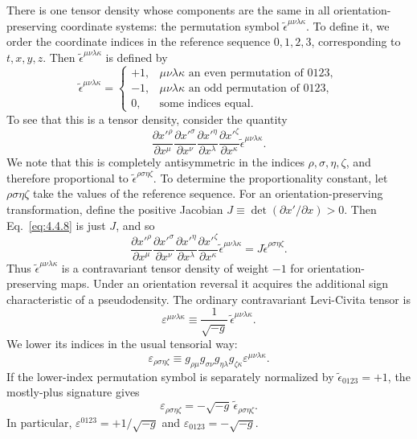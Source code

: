 There is one tensor density whose components are the same in all
orientation-preserving coordinate systems: the permutation symbol
\(\tilde\epsilon^{\mu\nu\lambda\kappa}\). To define it, we order the
coordinate indices in the reference sequence \(0,1,2,3\), corresponding to
\(t,x,y,z\). Then \(\tilde\epsilon^{\mu\nu\lambda\kappa}\) is defined by
\begin{equation}
  \tilde\epsilon^{\mu\nu\lambda\kappa}
  =
  \begin{cases}
    +1,& \mu\nu\lambda\kappa\text{ an even permutation of }0123,\\
    -1,& \mu\nu\lambda\kappa\text{ an odd permutation of }0123,\\
    0,& \text{some indices equal}.
  \end{cases}
  \tag{4.4.7}\label{eq:4.4.7}
\end{equation}
To see that this is a tensor density, consider the quantity
\begin{equation}
  \frac{\partial x'^\rho}{\partial x^\mu}
  \frac{\partial x'^\sigma}{\partial x^\nu}
  \frac{\partial x'^\eta}{\partial x^\lambda}
  \frac{\partial x'^\zeta}{\partial x^\kappa}
  \tilde\epsilon^{\mu\nu\lambda\kappa}.
  \tag{4.4.8}\label{eq:4.4.8}
\end{equation}
We note that this is completely antisymmetric in the indices
\(\rho,\sigma,\eta,\zeta\), and therefore proportional to
\(\tilde\epsilon^{\rho\sigma\eta\zeta}\). To determine the proportionality
constant, let \(\rho\sigma\eta\zeta\) take the values of the reference
sequence. For an orientation-preserving transformation, define the positive
Jacobian \(J\equiv\det(\partial x'/\partial x)>0\). Then
Eq.~\eqref{eq:4.4.8} is just \(J\), and so
\begin{equation}
  \frac{\partial x'^\rho}{\partial x^\mu}
  \frac{\partial x'^\sigma}{\partial x^\nu}
  \frac{\partial x'^\eta}{\partial x^\lambda}
  \frac{\partial x'^\zeta}{\partial x^\kappa}
  \tilde\epsilon^{\mu\nu\lambda\kappa}
  =
  J\tilde\epsilon^{\rho\sigma\eta\zeta}.
  \tag{4.4.9}\label{eq:4.4.9}
\end{equation}
Thus \(\tilde\epsilon^{\mu\nu\lambda\kappa}\) is a contravariant tensor
density of weight \(-1\) for orientation-preserving maps. Under an
orientation reversal it acquires the additional sign characteristic of a
pseudodensity. The ordinary contravariant Levi-Civita tensor is
\[
  \varepsilon^{\mu\nu\lambda\kappa}
  \equiv
  \frac{1}{\sqrt{-g}}\,
  \tilde\epsilon^{\mu\nu\lambda\kappa}.
\]
We lower its indices in the usual tensorial way:
\begin{equation}
  \varepsilon_{\rho\sigma\eta\zeta}
  \equiv
  g_{\rho\mu}g_{\sigma\nu}g_{\eta\lambda}g_{\zeta\kappa}
  \varepsilon^{\mu\nu\lambda\kappa}.
  \tag{4.4.10}\label{eq:4.4.10}
\end{equation}
If the lower-index permutation symbol is separately normalized by
\(\tilde\epsilon_{0123}=+1\), the mostly-plus signature gives
\begin{equation}
  \varepsilon_{\rho\sigma\eta\zeta}
  =
  -\sqrt{-g}\,
  \tilde\epsilon_{\rho\sigma\eta\zeta}.
  \tag{4.4.11}\label{eq:4.4.11}
\end{equation}
In particular,
\(\varepsilon^{0123}=+1/\sqrt{-g}\) and
\(\varepsilon_{0123}=-\sqrt{-g}\).

